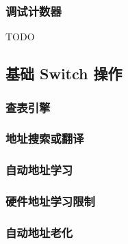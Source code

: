 \subsubsection{调试计数器}
TODO

\subsection{基础 Switch 操作}

\subsubsection{查表引擎}

\subsubsection{地址搜索或翻译}

\subsubsection{自动地址学习}

\subsubsection{硬件地址学习限制}

\subsubsection{自动地址老化}